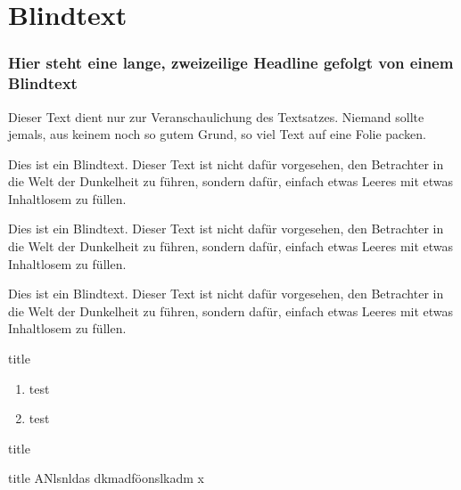 \documentclass[aspectratio=1610, professionalfonts, 9pt]{beamer}
\begin{document}
\section{Blindtext}
\begin{frame}
  \frametitle{Hier steht eine lange, zweizeilige Headline
  \newline gefolgt von einem Blindtext}
  Dieser Text dient nur zur Veranschaulichung des Textsatzes. Niemand sollte jemals, aus keinem noch so gutem Grund, so viel Text auf eine Folie packen.

  Dies ist ein Blindtext. Dieser Text ist nicht dafür vorgesehen, den Betrachter in die Welt der Dunkelheit zu führen, sondern dafür, einfach etwas Leeres mit etwas Inhaltlosem zu füllen.

  Dies ist ein Blindtext. Dieser Text ist nicht dafür vorgesehen, den Betrachter in die Welt der Dunkelheit zu führen, sondern dafür, einfach etwas Leeres mit etwas Inhaltlosem zu füllen.

  Dies ist ein Blindtext. Dieser Text ist nicht dafür vorgesehen, den Betrachter in die Welt der Dunkelheit zu führen, sondern dafür, einfach etwas Leeres mit etwas Inhaltlosem zu füllen.
\end{frame}

\begin{frame}{title}
  \begin{enumerate}
	\item test
	\item test
  \end{enumerate}
\end{frame}

\begin{frame}{title}
  \begin{block}{title}
	ANlsnldas dkmadföonslkadm x
  \end{block}
 \end{frame}
\end{document}
